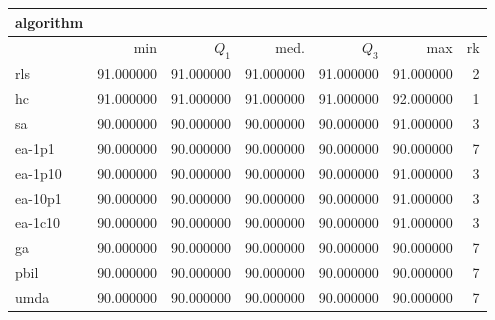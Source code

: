 \begin{tabular}{@{}l*{5}{>{{}}N{3}{0}}>{{}}N{2}{0}@{}}
\toprule
{algorithm} &  \\
\midrule
& {min} & {$Q_1$} & {med.} & {$Q_3$} & {max} & {rk}\\
\midrule
rls & {\color{blue}} 91.000000 & {\color{blue}} 91.000000 & {\color{blue}} 91.000000 & {\color{blue}} 91.000000 & 91.000000 & 2\\
hc & {\color{blue}} 91.000000 & {\color{blue}} 91.000000 & {\color{blue}} 91.000000 & {\color{blue}} 91.000000 & {\color{blue}} 92.000000 & 1\\
sa & 90.000000 & 90.000000 & 90.000000 & 90.000000 & 91.000000 & 3\\
ea-1p1 & 90.000000 & 90.000000 & 90.000000 & 90.000000 & 90.000000 & 7\\
ea-1p10 & 90.000000 & 90.000000 & 90.000000 & 90.000000 & 91.000000 & 3\\
ea-10p1 & 90.000000 & 90.000000 & 90.000000 & 90.000000 & 91.000000 & 3\\
ea-1c10 & 90.000000 & 90.000000 & 90.000000 & 90.000000 & 91.000000 & 3\\
ga & 90.000000 & 90.000000 & 90.000000 & 90.000000 & 90.000000 & 7\\
pbil & 90.000000 & 90.000000 & 90.000000 & 90.000000 & 90.000000 & 7\\
umda & 90.000000 & 90.000000 & 90.000000 & 90.000000 & 90.000000 & 7\\
\bottomrule
\end{tabular}

